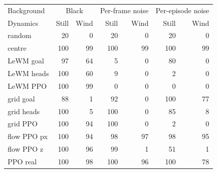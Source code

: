 \begin{tabular}{lrrrrrr}
\toprule
Background & \multicolumn{2}{c}{Black} & \multicolumn{2}{c}{Per-frame noise} & \multicolumn{2}{c}{Per-episode noise} \\
Dynamics & Still & Wind & Still & Wind & Still & Wind \\
\midrule
random & 20 & 0 & 20 & 0 & 20 & 0 \\
centre & 100 & 99 & 100 & 99 & 100 & 99 \\
LeWM goal & 97 & 64 & 5 & 0 & 80 & 0 \\
LeWM heads & 100 & 60 & 9 & 0 & 2 & 0 \\
LeWM PPO & 100 & 99 & 0 & 0 & 0 & 0 \\
grid goal & 88 & 1 & 92 & 0 & 100 & 77 \\
grid heads & 100 & 5 & 100 & 0 & 85 & 8 \\
grid PPO & 100 & 94 & 100 & 0 & 2 & 0 \\
flow PPO px & 100 & 94 & 98 & 97 & 98 & 95 \\
flow PPO z & 100 & 96 & 99 & 1 & 51 & 1 \\
PPO real & 100 & 98 & 100 & 96 & 100 & 78 \\
\bottomrule
\end{tabular}
